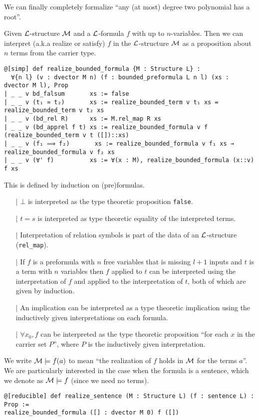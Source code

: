 We can finally completely formalize
``any (at most) degree two polynomial has a root''.

\begin{dfn}

    Given $\mathcal{L}$-structure $\mathcal{M}$ and a $\mathcal{L}$-formula $f$ with up to $n$-variables.
    Then we can interpret (a.k.a realize or satisfy) $f$ in the $\mathcal{L}$-structure $\mathcal{M}$ as a
    proposition about $n$ terms from the carrier type.

    \begin{lstlisting}
@[simp] def realize_bounded_formula {M : Structure L} :
  ∀{n l} (v : dvector M n) (f : bounded_preformula L n l) (xs : dvector M l), Prop
| _ _ v bd_falsum       xs := false
| _ _ v (t₁ ≃ t₂)       xs := realize_bounded_term v t₁ xs = realize_bounded_term v t₂ xs
| _ _ v (bd_rel R)      xs := M.rel_map R xs
| _ _ v (bd_apprel f t) xs := realize_bounded_formula v f (realize_bounded_term v t ([])::xs)
| _ _ v (f₁ ⟹ f₂)       xs := realize_bounded_formula v f₁ xs → realize_bounded_formula v f₂ xs
| _ _ v (∀' f)          xs := ∀(x : M), realize_bounded_formula (x::v) f xs \end{lstlisting}

  This is defined by induction on (pre)formulas.
  \begin{itemize}
    \item[$\vert$] $\bot$ is interpreted as the type theoretic proposition \texttt{false}.
    \item[$\vert$] $t = s$ is interpreted as type theoretic equality of the interpreted terms.
    \item[$\vert$] Interpretation of relation symbols is part of the data of an
          $\mathcal{L}$-structure (\texttt{rel\_map}).
    \item[$\vert$] If $f$ is a preformula with $n$ free variables that is missing
          $l + 1$ inputs and $t$ is a term with $n$ variables
          then $f$ applied to $t$ can be interpreted using the interpretation of $f$ and
          applied to the interpretation of $t$, both of which are given by induction.
    \item[$\vert$] An implication can be interpreted as a type theoretic implication
          using the inductively given interpretations on each formula.
    \item[$\vert$] $\forall x_{0}, f$ can be interpreted as the type theoretic proposition
          ``for each $x$ in the carrier set $P$'',
          where $P$ is the inductively given interpretation.
  \end{itemize}

  We write $\mathcal{M} \models f(a)$ to mean ``the realization of $f$ holds in $\mathcal{M}$ for the terms $a$''.
  We are particularly interested in the case when the formula is a sentence,
  which we denote as $\mathcal{M} \models f$ (since we need no terms).
  \begin{lstlisting}
@[reducible] def realize_sentence (M : Structure L) (f : sentence L) : Prop :=
realize_bounded_formula ([] : dvector M 0) f ([])\end{lstlisting}
\end{dfn}

